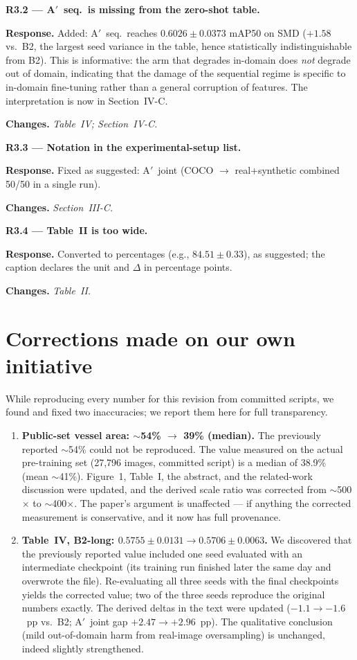 \documentclass[11pt]{article}
\newcommand{\resp}[1]{\par\noindent\textbf{Response.} #1}
\newcommand{\chg}[1]{\par\noindent\textbf{Changes.} \textit{#1}}
\newcommand{\pt}[1]{\par\medskip\noindent\textbf{#1}}
\begin{document}
\pt{R3.2 --- A$'$~seq.\ is missing from the zero-shot table.}
\resp{Added: A$'$~seq.\ reaches $0.6026\pm0.0373$ mAP50 on SMD ($+1.58$ vs.\
B2, the largest seed variance in the table, hence statistically
indistinguishable from B2). This is informative: the arm that degrades
in-domain does \emph{not} degrade out of domain, indicating that the damage of
the sequential regime is specific to in-domain fine-tuning rather than a
general corruption of features. The interpretation is now in Section~IV-C.}
\chg{Table~IV; Section~IV-C.}

\pt{R3.3 --- Notation in the experimental-setup list.}
\resp{Fixed as suggested: A$'$~joint (COCO $\rightarrow$ real+synthetic
combined 50/50 in a single run).}
\chg{Section~III-C.}

\pt{R3.4 --- Table~II is too wide.}
\resp{Converted to percentages (e.g., $84.51\pm0.33$), as suggested; the
caption declares the unit and $\Delta$ in percentage points.}
\chg{Table~II.}

\section*{Corrections made on our own initiative}

While reproducing every number for this revision from committed scripts, we
found and fixed two inaccuracies; we report them here for full transparency.

\begin{enumerate}[leftmargin=1.4em]
\item \textbf{Public-set vessel area: $\sim$54\% $\rightarrow$ 39\%
(median).} The previously reported $\sim$54\% could not be reproduced. The
value measured on the actual pre-training set (27{,}796 images, committed
script) is a median of 38.9\% (mean $\sim$41\%). Figure~1, Table~I, the
abstract, and the related-work discussion were updated, and the derived scale
ratio was corrected from $\sim$500$\times$ to $\sim$400$\times$. The paper's
argument is unaffected --- if anything the corrected measurement is
conservative, and it now has full provenance.
\item \textbf{Table~IV, B2-long: $0.5755\pm0.0131 \rightarrow
0.5706\pm0.0063$.} We discovered that the previously reported value included
one seed evaluated with an intermediate checkpoint (its training run finished
later the same day and overwrote the file). Re-evaluating all three seeds with
the final checkpoints yields the corrected value; two of the three seeds
reproduce the original numbers exactly. The derived deltas in the text were
updated ($-1.1\rightarrow-1.6$~pp vs.\ B2; A$'$~joint gap
$+2.47\rightarrow+2.96$~pp). The qualitative conclusion (mild out-of-domain
harm from real-image oversampling) is unchanged, indeed slightly
strengthened.
\end{enumerate}
\end{document}
